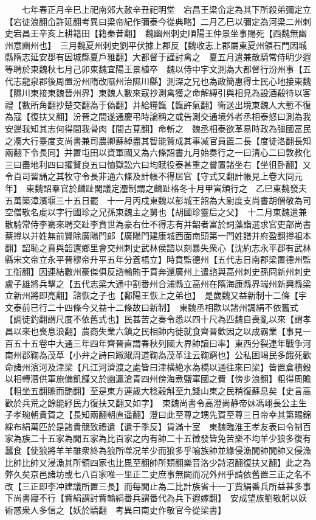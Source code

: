 　　七年春正月辛巳上祀南郊大赦辛丑祀明堂　宕昌王梁仚定為其下所殺弟彌定立【宕徒浪翻仚許延翻考異曰梁帝紀作彌泰今從典略】二月乙巳以彌定為河梁二州刺史宕昌王辛亥上耕籍田【籍秦昔翻】　魏幽州刺史順陽王仲景坐事賜死【西魏無幽州意豳州也】　三月魏夏州刺史劉平伏據上郡反【魏收志上郡屬東夏州領石門因城縣隋志延安郡有因城縣夏戶雅翻】大都督于謹討禽之　夏五月遣兼散騎常侍明少遐等聘於東魏秋七月己卯東魏宜陽王景植卒　魏以侍中宇文測為大都督行汾州事【五代志龍泉郡後周置汾州隋改隰州治隰川縣】測深之兄也為政簡惠得士民心地接東魏【隰川東接東魏晉州界】東魏人數來寇抄測禽獲之命解縛引與相見為設酒殽待以客禮【數所角翻抄楚交翻為于偽翻】并給糧餼【餼許氣翻】衛送出境東魏人大慙不復為寇【復扶又翻】汾晉之間遂通慶弔時論稱之或告測交通境外者丞相泰怒曰測為我安邊我知其志何得間我骨肉【間古莧翻】命斬之　魏丞相泰欲革易時政為彊國富民之灋大行臺度支尚書兼司農卿蘇綽盡其智能贊成其事减官員置二長【度徒洛翻長知兩翻下令長同】并置屯田以資軍國又為六條詔書九月始奏行之一曰清心二曰敦教化三曰盡地利四曰擢賢良五曰恤獄訟六曰均賦役泰甚重之嘗置諸坐右【坐徂卧翻】又令百司習誦之其牧守令長非通六條及計帳不得居官【守式又翻計帳見上卷大同元年】　東魏詔羣官於麟趾閣議定灋制謂之麟趾格冬十月甲寅頒行之　乙巳東魏發夫五萬築漳濱堰三十五日罷　十一月丙戍東魏以彭城王韶為大尉度支尚書胡僧敬為司空僧敬名䖍以字行國珍之兄孫東魏主之舅也【胡國珍靈后之父】　十二月東魏遣兼散騎常侍李騫來聘交趾李賁世為豪右仕不得志有并韶者富於詞藻詣選求官吏部尚書蔡撙以并姓無前賢除廣陽門郎【廣陽門建康城西面南頭第一門姓譜并府盈翻撙祖本翻】韶恥之賁與韶還鄉里會交州刺史武林侯諮以刻暴失衆心【沈約志永平郡有武林縣宋文帝立永平晉穆帝升平五年分蒼梧立】時賁監德州【五代志日南郡梁置德州監工衘翻】因連結數州豪傑俱反諮輸賄于賁奔還廣州上遣諮與高州刺史孫冏新州刺史盧子雄將兵擊之【五代志梁大通中割番州合浦縣立高州在隋海康縣界端州新興縣梁立新州將即亮翻】諮恢之子也【鄱陽王恢上之弟也】　是歲魏又益新制十二條【宇文泰前已行二十四條今又益十二條故曰新制】　東魏丞相歡以諸州調絹不依舊式【調徒釣翻謂尺度不依舊式也】民甚苦之奏令悉以四十尺為匹魏自喪亂以來【謂孝昌以來也喪息浪翻】農商失業六鎮之民相帥内徙就食齊晉歡因之以成霸業【事見一百五十五卷中大通三年四年齊晉直謂春秋列國大界帥讀曰率】東西分裂連年戰争河南州郡鞠為茂草【小弁之詩曰踧踧周道鞠為茂革注云鞠窮也】公私困竭民多餓死歡命諸州濱河及津梁【凡江河濟渡之處皆曰津横絶水為橋以通往來曰梁】皆置倉積穀以相轉漕供軍旅備飢饉又於幽瀛滄青四州傍海煮鹽軍國之費【傍步浪翻】粗得周贍【粗坐五翻贍而艶翻】至是東方連歲大稔穀斛至九錢山東之民稍復蘇息矣【史言高歡於兵荒之餘能紓民力復扶又翻又如字】　東魏尚書令高澄尚静帝妹馮翊長公主生子孝琬朝貴賀之【長知兩翻朝直遥翻】澄曰此至尊之甥先賀至尊三日帝幸其第賜錦綵布絹萬匹於是諸貴競致禮遺【遺于季反】貨滿十室　東魏臨淮王孝友表曰令制百家為族二十五家為閭五家為比百家之内有帥二十五徵發皆免苦樂不均羊少狼多復有蠶食【使狼將羊羊雖衆終為狼所噬况羊少而狼多乎喻族帥並緣侵漁閭帥閭帥又侵漁比帥比帥又浸漁其所領四家也比毘至翻帥所類翻樂音洛少詩沼翻復扶又翻】此之為弊久矣京邑諸坊或七八百家唯一里正二史庶事無闕而况外州乎請依舊置三正之名不改【三正即李冲建議所置三長】而每閭止為二比計族省十一丁貲絹番兵所益甚多事下尚書寢不行【貲絹謂討貲輸絹番兵謂番代為兵下遐嫁翻】　安成望族劉敬躬以妖術惑衆人多信之【妖於驕翻　考異曰南史作敬官今從梁書】

